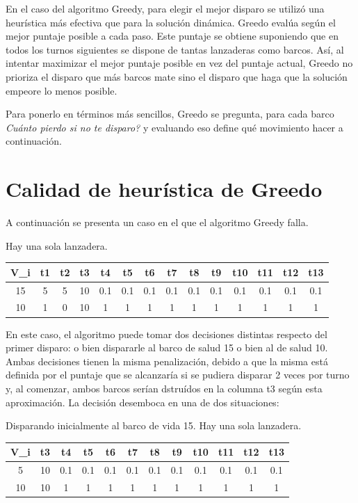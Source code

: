 \documentclass{article}
\begin{document}
En el caso del algoritmo Greedy, para elegir el mejor disparo se utilizó una heurística más efectiva que para la solución dinámica. Greedo evalúa según el mejor puntaje posible a cada paso. Este puntaje se obtiene suponiendo que en todos los turnos siguientes se dispone de tantas lanzaderas como barcos. Así, al intentar maximizar el mejor puntaje posible en vez del puntaje actual, Greedo no prioriza el disparo que más barcos mate sino el disparo que haga que la solución empeore lo menos posible.

Para ponerlo en términos más sencillos, Greedo se pregunta, para cada barco \textit{Cuánto pierdo si no te disparo?} y evaluando eso define qué movimiento hacer a continuación.

\section{Calidad de heurística de Greedo}
A continuación se presenta un caso en el que el algoritmo Greedy falla.

Hay una sola lanzadera. \\
\begin{center}
\begin{tabular}{ c | c c c c c c c c c c c c c}
\hline
V\_i & t1 & t2 & t3 & t4 & t5 & t6 & t7 & t8 & t9 & t10 & t11 & t12 & t13 \\
\hline
15    &  5 &  5 &  10 &  0.1 &  0.1 &  0.1 & 0.1 &  0.1 &  0.1 &  0.1 &  0.1 & 0.1  & 0.1 \\
10    &  1 &  0 &  10 &  1 &  1 &  1 & 1 &  1 &  1 &  1 &  1 & 1  & 1
\end{tabular}
\end{center}

En este caso, el algoritmo puede tomar dos decisiones distintas respecto del primer disparo: o bien dispararle al barco de salud 15 o bien al de salud 10. Ambas decisiones tienen la misma penalización, debido a que la misma está definida por el puntaje que se alcanzaría si se pudiera disparar 2 veces por turno y, al comenzar, ambos barcos serían dstruídos en la columna t3 según esta aproximación. La decisión desemboca en una de dos situaciones:

Disparando inicialmente al barco de vida 15. Hay una sola lanzadera. \\
\begin{center}
\begin{tabular}{ c | c c c c c c c c c c c}
\hline
V\_i &   t3 & t4 & t5 & t6 & t7 & t8 & t9 & t10 & t11 & t12 & t13 \\
\hline
5     &  10 &  0.1 &  0.1 &  0.1 & 0.1 &  0.1 &  0.1 &  0.1 &  0.1 & 0.1  & 0.1 \\
10    &  10 &  1 &  1 &  1 & 1 &  1 &  1 &  1 &  1 & 1  & 1
\end{tabular}
\end{center}
\end{document}
